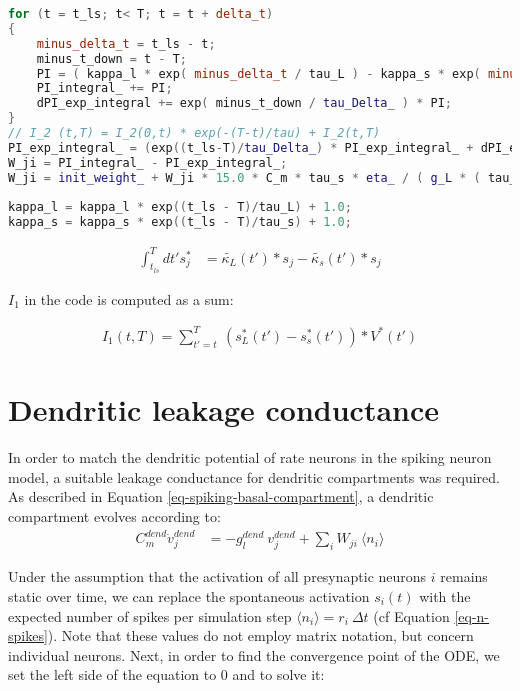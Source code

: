 \begin{lstlisting}[language=C++, directivestyle={\color{black}}
                   emph={int,char,double,float,unsigned,exp},
                   emphstyle={\color{blue}}]
for (t = t_ls; t< T; t = t + delta_t)
{
   	minus_delta_t = t_ls - t;
    minus_t_down = t - T;
    PI = ( kappa_l * exp( minus_delta_t / tau_L ) - kappa_s * exp( minus_delta_t / tau_s ) ) * V_star(t);
    PI_integral_ += PI;
    dPI_exp_integral += exp( minus_t_down / tau_Delta_ ) * PI;
}  
// I_2 (t,T) = I_2(0,t) * exp(-(T-t)/tau) + I_2(t,T)
PI_exp_integral_ = (exp((t_ls-T)/tau_Delta_) * PI_exp_integral_ + dPI_exp_integral);
W_ji = PI_integral_ - PI_exp_integral_;
W_ji = init_weight_ + W_ji * 15.0 * C_m * tau_s * eta_ / ( g_L * ( tau_L - tau_s ) );    
  
kappa_l = kappa_l * exp((t_ls - T)/tau_L) + 1.0;
kappa_s = kappa_s * exp((t_ls - T)/tau_s) + 1.0;
  \end{lstlisting}


\begin{align}
  \int_{t_{ls}}^T dt' s_j^* & =  \tilde{\kappa_L}(t') * s_j -  \tilde{\kappa_s}(t') * s_j
\end{align}

$I_1$ in the code is computed as a sum:

\begin{align}
  I_1 (t,T) = \sum_{t'=t}^T \ (s_L^*(t') - s_s^*(t')) * V^*(t')
\end{align}



\section{Dendritic leakage conductance}\label{sec-gl-dend}

In order to match the dendritic potential of rate neurons  in the spiking neuron model, a suitable leakage conductance
for dendritic compartments was required. As described in Equation \ref{eq-spiking-basal-compartment}, a dendritic
compartment evolves according to:
\begin{align}
  C_m^{dend} \dot{v}_j^{dend} & = -g_l^{dend} \  v_j^{dend} + \sum_i W_{ji} \    \langle \textit{n}_i \rangle
\end{align}

Under the assumption that the activation of all presynaptic neurons $i$ remains static over time, we can replace the
spontaneous activation $s_i(t)$ with the expected number of spikes per simulation step $\langle \textit{n}_i \rangle =
r_i \ \Delta t$ (cf Equation \ref{eq-n-spikes}). Note that these values do not employ matrix notation, but concern
individual neurons. Next, in order to find the convergence point of the ODE, we set the left side of the equation to $0$
and to solve it:


